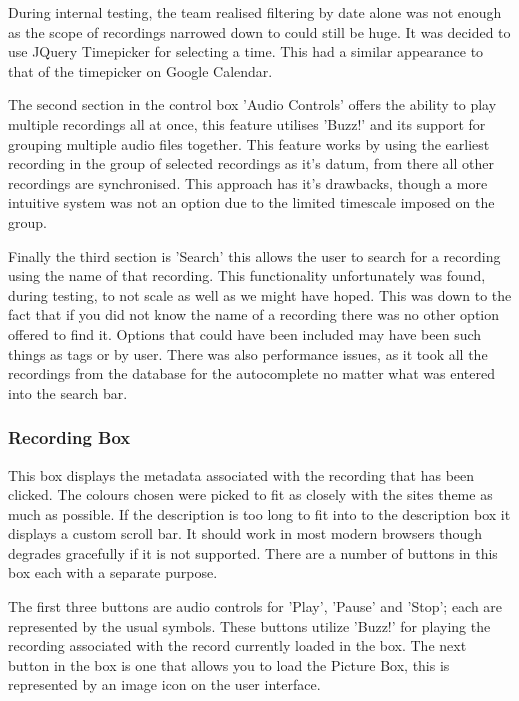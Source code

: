 \documentclass{l3proj}
\begin{document}
During internal testing, the team realised filtering by date alone was not enough as the scope of recordings narrowed down to could still be huge. It was decided to use JQuery Timepicker\cite{jQueryTimepicker} for selecting a time. This had a similar appearance to that of the timepicker on Google Calendar\cite{googleCalendar}.

The second section in the control box 'Audio Controls' offers the ability to play multiple recordings all at once, this feature utilises 'Buzz!' and its support for grouping multiple audio files together. This feature works by using the earliest recording in the group of selected recordings as it's datum, from there all other recordings are synchronised. This approach has it's drawbacks, though a more intuitive system was not an option due to the limited timescale imposed on the group.

Finally the third section is 'Search' this allows the user to search for a recording using the name of that recording. This functionality unfortunately was found, during testing, to not scale as well as we might have hoped. This was down to the fact that if you did not know the name of a recording there was no other option offered to find it. Options that could have been included may have been such things as tags or by user. There was also performance issues, as it took all the recordings from the database for the autocomplete no matter what was entered into the search bar.

\subsubsection{Recording Box}

This box displays the metadata associated with the recording that has been clicked. The colours chosen were picked to fit as closely with the sites theme as much as possible. If the description is too long to fit into to the description box it displays a custom  scroll bar. It should work in most modern browsers though degrades gracefully if it is not supported. There are a number of buttons in this box each with a separate purpose.

The first three buttons are audio controls for 'Play', 'Pause' and 'Stop'; each are represented by the usual symbols. These buttons utilize 'Buzz!' for playing the recording associated with the record currently loaded in the box. The next button in the box is one that allows you to load the Picture Box, this is represented by an image icon on the user interface.
\end{document}
